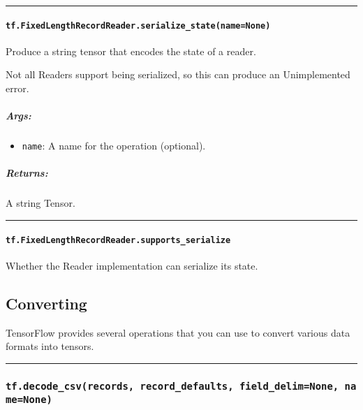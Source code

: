 \begin{center}\rule{0.5\linewidth}{\linethickness}\end{center}

\paragraph{\texorpdfstring{\texttt{tf.FixedLengthRecordReader.serialize\_state(name=None)}
}{tf.FixedLengthRecordReader.serialize\_state(name=None) }}\label{tf.fixedlengthrecordreader.serializeux5fstatenamenone}

Produce a string tensor that encodes the state of a reader.

Not all Readers support being serialized, so this can produce an
Unimplemented error.

\subparagraph{Args: }\label{args-42}

\begin{itemize}
\tightlist
\item
  \texttt{name}: A name for the operation (optional).
\end{itemize}

\subparagraph{Returns: }\label{returns-36}

A string Tensor.

\begin{center}\rule{0.5\linewidth}{\linethickness}\end{center}

\paragraph{\texorpdfstring{\texttt{tf.FixedLengthRecordReader.supports\_serialize}
}{tf.FixedLengthRecordReader.supports\_serialize }}\label{tf.fixedlengthrecordreader.supportsux5fserialize}

Whether the Reader implementation can serialize its state.

\subsection{Converting }\label{converting}

TensorFlow provides several operations that you can use to convert
various data formats into tensors.

\begin{center}\rule{0.5\linewidth}{\linethickness}\end{center}

\subsubsection{\texorpdfstring{\texttt{tf.decode\_csv(records,\ record\_defaults,\ field\_delim=None,\ name=None)}
}{tf.decode\_csv(records, record\_defaults, field\_delim=None, name=None) }}\label{tf.decodeux5fcsvrecords-recordux5fdefaults-fieldux5fdelimnone-namenone}

